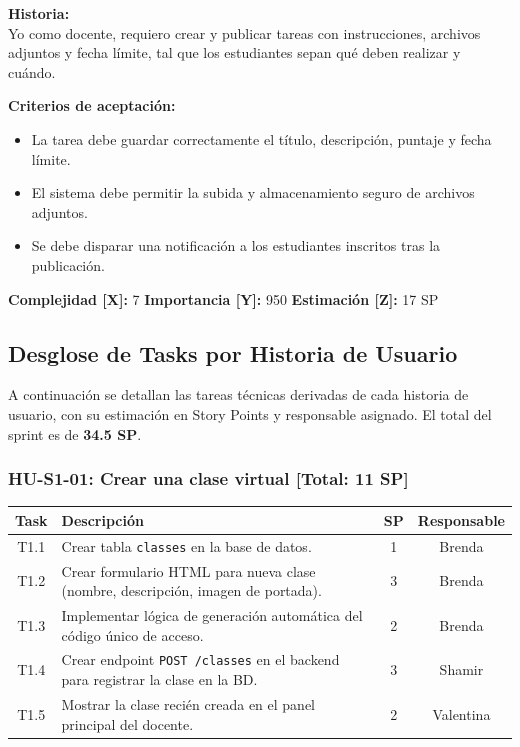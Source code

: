 \documentclass[12pt,a4paper]{article}
\renewcommand{\arraystretch}{1.45}
\begin{document}
\vspace{0.5em}

\begin{tcolorbox}[title=\textbf{HU-S1-03: Publicar una tarea con fecha de entrega}]
\textbf{Historia:} \\
Yo como docente, requiero crear y publicar tareas con instrucciones, archivos adjuntos y fecha límite, tal que los estudiantes sepan qué deben realizar y cuándo.

\vspace{0.5em}
\textbf{Criterios de aceptación:}
\begin{itemize}
    \item La tarea debe guardar correctamente el título, descripción, puntaje y fecha límite.
    \item El sistema debe permitir la subida y almacenamiento seguro de archivos adjuntos.
    \item Se debe disparar una notificación a los estudiantes inscritos tras la publicación.
\end{itemize}
\textbf{Complejidad [X]:} 7 \hfill \textbf{Importancia [Y]:} 950 \hfill \textbf{Estimación [Z]:} 17 SP
\end{tcolorbox}

\newpage

\subsection{Desglose de Tasks por Historia de Usuario}

A continuación se detallan las tareas técnicas derivadas de cada historia de usuario, con su estimación en Story Points y responsable asignado. El total del sprint es de \textbf{34.5 SP}.

\subsubsection*{HU-S1-01: Crear una clase virtual \hfill \textnormal{[Total: 11 SP]}}

\begin{table}[H]
\centering
\renewcommand{\arraystretch}{1.2}
\begin{tabular}{|c|p{8cm}|c|c|}
\hline
\textbf{Task} & \textbf{Descripción} & \textbf{SP} & \textbf{Responsable} \\
\hline
T1.1 & Crear tabla \texttt{classes} en la base de datos. & 1 & Brenda \\
\hline
T1.2 & Crear formulario HTML para nueva clase (nombre, descripción, imagen de portada). & 3 & Brenda \\
\hline
T1.3 & Implementar lógica de generación automática del código único de acceso. & 2 & Brenda \\
\hline
T1.4 & Crear endpoint \texttt{POST /classes} en el backend para registrar la clase en la BD. & 3 & Shamir \\
\hline
T1.5 & Mostrar la clase recién creada en el panel principal del docente. & 2 & Valentina \\
\hline
\end{tabular}
\end{table}
\end{document}
